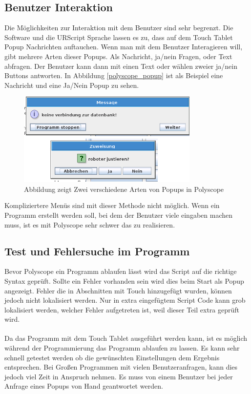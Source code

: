 \subsection{Benutzer Interaktion}
\label{user_interaktion_polyscope_rel}

Die Möglichkeiten zur Interaktion mit dem Benutzer sind sehr begrenzt. Die Software und die URScript Sprache lassen es zu, dass auf dem Touch Tablet \ac{Popup} Nachrichten auftauchen. Wenn man mit dem Benutzer Interagieren will, gibt mehrere Arten dieser \ac{Popup}s.
Als Nachricht, ja/nein Fragen, oder Text abfragen. Der Benutzer kann dann mit einen Text oder wählen zweier ja/nein Buttons antworten. In Abbildung \ref{polyscope_popup} ist als Beispiel eine Nachricht und eine Ja/Nein \ac{Popup} zu sehen.

\begin{figure}[H]
  \centering
    \includegraphics[width=0.8\textwidth]{pic/popup_question.png}
      \caption[Popup in Polyscipe]{Abbildung zeigt Zwei verschiedene Arten von Popups in Polyscope}
      \label{fig:polyscope_popup}
\end{figure}

Kompliziertere Menüs sind mit dieser Methode nicht möglich. Wenn ein Programm erstellt werden soll, bei dem der Benutzer viele eingaben machen muss, ist es mit Polyscope sehr schwer das zu realisieren.

\subsection{Test und Fehlersuche im Programm}
\label{debuggin_polyscope_rel}

Bevor Polyscope ein Programm ablaufen lässt wird das Script auf die richtige Syntax geprüft. Sollte ein Fehler vorhanden sein wird dies beim Start als \ac{Popup} angezeigt. Fehler die in Abschnitten mit Touch hinzugefügt wurden, können jedoch nicht lokalisiert werden. Nur in extra eingefügtem Script Code kann grob lokalisiert werden, welcher Fehler aufgetreten ist, weil dieser Teil extra geprüft wird.
\\\\
Da das Programm mit dem Touch Tablet ausgeführt werden kann, ist es möglich während der Programmierung das Programm ablaufen zu lassen. Es kann sehr schnell getestet werden ob die gewünschten Einstellungen dem Ergebnis entsprechen. Bei Großen Programmen mit vielen Benutzeranfragen, kann dies jedoch viel Zeit in Anspruch nehmen. Es muss von einem Benutzer bei jeder Anfrage eines \ac{Popup}s von Hand geantwortet werden.


